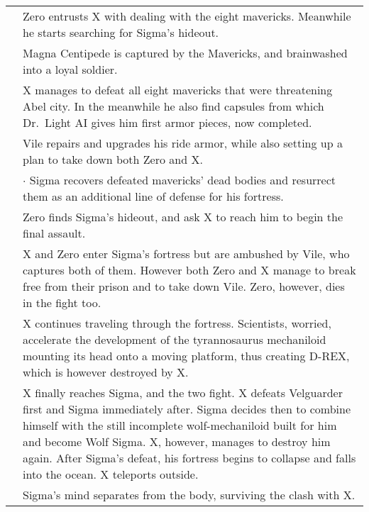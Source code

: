 \begin{tabularx}{\linewidth}{l X}
	\tabdot& Zero entrusts X with dealing with the eight mavericks. Meanwhile he starts searching for Sigma's hideout.\\
	\tabdot& Magna Centipede is captured by the Mavericks, and brainwashed into a loyal soldier.\\
	\tabdot& X manages to defeat all eight mavericks that were threatening Abel city. In the meanwhile he also find capsules from which Dr.~Light AI gives him first armor pieces, now completed.\\
	\tabdot& Vile repairs and upgrades his ride armor, while also setting up a plan to take down both Zero and X.\\
	\tabline& $\cdot$ Sigma recovers defeated mavericks' dead bodies and resurrect them as an additional line of defense for his fortress.\\
	\tabdot& Zero finds Sigma's hideout, and ask X to reach him to begin the final assault.\\
	\tabdot& X and Zero enter Sigma's fortress but are ambushed by Vile, who captures both of them. However both Zero and X manage to break free from their prison and to take down Vile. Zero, however, dies in the fight too.\\
	\tabdot& X continues traveling through the fortress. Scientists, worried, accelerate the development of the tyrannosaurus mechaniloid mounting its head onto a moving platform, thus creating D-REX, which is however destroyed by X.\\
	\tabdot& X finally reaches Sigma, and the two fight. X defeats Velguarder first and Sigma immediately after. Sigma decides then to combine himself with the still incomplete wolf-mechaniloid built for him and become Wolf Sigma. X, however, manages to destroy him again. After Sigma's defeat, his fortress begins to collapse and falls into the ocean. X teleports outside.\\
	\tabdot& Sigma's mind separates from the body, surviving the clash with X.\\
	\midrule
	

\end{tabularx}
